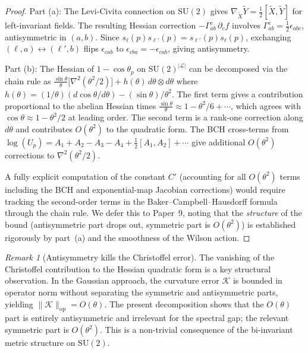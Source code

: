 \documentclass[11pt,a4paper]{article}
\theoremstyle{plain}
\theoremstyle{definition}
\theoremstyle{remark}
\newtheorem{remark}[theorem]{Remark}
\newcommand{\SU}{\mathrm{SU}}
\newcommand{\op}{\mathrm{op}}
\newcommand{\norm}[1]{\|#1\|}
\newcommand{\cK}{\mathcal{K}}
\newcommand{\cL}{\mathcal{L}}
\begin{document}
\begin{proof}
Part (a): The Levi-Civita connection on $\SU(2)$ gives
$\nabla_{\tilde X}\tilde Y = \frac{1}{2}[\tilde X, \tilde Y]$
for left-invariant fields. The resulting Hessian correction
$-\Gamma^c_{ab}\,\partial_c f$ involves $\Gamma^c_{ab}
= \frac{1}{2}\epsilon_{abc}$, antisymmetric in $(a,b)$.
Since $s_\ell(p)s_{\ell'}(p) = s_{\ell'}(p)s_\ell(p)$, exchanging
$(\ell,a) \leftrightarrow (\ell',b)$ flips $\epsilon_{cab}$ to
$\epsilon_{cba} = -\epsilon_{cab}$, giving antisymmetry.

Part (b): The Hessian of $1 - \cos\theta_p$ on
$\SU(2)^{|\cL|}$ can be decomposed via the chain rule as
$\frac{\sin\theta}{\theta}\bigl[\nabla^2(\theta^2/2)\bigr]
+ h(\theta)\,d\theta \otimes d\theta$
where $h(\theta) = (1/\theta)(d\cos\theta/d\theta)
- (\sin\theta)/\theta^2$. The first term gives a contribution
proportional to the abelian Hessian times $\frac{\sin\theta}{\theta}
\approx 1 - \theta^2/6 + \cdots$, which agrees with
$\cos\theta \approx 1 - \theta^2/2$ at leading order. The second
term is a rank-one correction along $d\theta$ and contributes
$O(\theta^2)$ to the quadratic form.
The BCH cross-terms from $\log(U_p) = A_1 + A_2 - A_3 - A_4
+ \frac{1}{2}[A_1,A_2] + \cdots$ give additional $O(\theta^2)$
corrections to $\nabla^2(\theta^2/2)$.

A fully explicit computation of the constant $C'$ (accounting for all
$O(\theta^2)$ terms including the BCH and exponential-map Jacobian
corrections) would require tracking the second-order terms in the
Baker--Campbell--Hausdorff formula through the chain rule. We defer
this to Paper~9, noting that the \emph{structure} of the bound
(antisymmetric part drops out, symmetric part is $O(\theta^2)$)
is established rigorously by part~(a) and the smoothness of the
Wilson action.
\end{proof}

\begin{remark}[Antisymmetry kills the Christoffel error]
The vanishing of the Christoffel contribution to the Hessian
quadratic form is a key structural observation. In the Gaussian
approach, the curvature error $\cK$ is bounded in operator norm
without separating the symmetric and antisymmetric parts, yielding
$\norm{\cK}_\op = O(\theta)$. The present decomposition shows that
the $O(\theta)$ part is entirely antisymmetric and irrelevant for
the spectral gap; the relevant symmetric part is $O(\theta^2)$.
This is a non-trivial consequence of the bi-invariant metric
structure on $\SU(2)$.
\end{remark}
\end{document}

